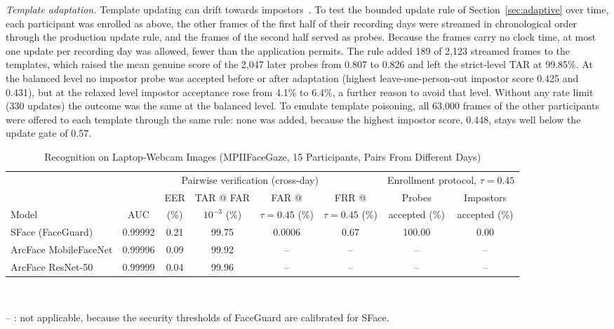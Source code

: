 \documentclass{ieeeaccess}
\begin{document}
\emph{Template adaptation.} Template updating can drift towards impostors~\cite{rattani2008coupdate}. To test the bounded update rule of Section~\ref{sec:adaptive} over time, each participant was enrolled as above, the other frames of the first half of their recording days were streamed in chronological order through the production update rule, and the frames of the second half served as probes. Because the frames carry no clock time, at most one update per recording day was allowed, fewer than the application permits. The rule added 189 of 2,123 streamed frames to the templates, which raised the mean genuine score of the 2,047 later probes from 0.807 to 0.826 and left the strict-level TAR at 99.85\%. At the balanced level no impostor probe was accepted before or after adaptation (highest leave-one-person-out impostor score 0.425 and 0.431), but at the relaxed level impostor acceptance rose from 4.1\% to 6.4\%, a further reason to avoid that level. Without any rate limit (330 updates) the outcome was the same at the balanced level. To emulate template poisoning, all 63,000 frames of the other participants were offered to each template through the same rule: none was added, because the highest impostor score, 0.448, stays well below the update gate of 0.57.

\begin{table}[!t]
\centering
\caption{Recognition on Laptop-Webcam Images (MPIIFaceGaze, 15 Participants, Pairs From Different Days)}
\label{tab:mpii}
\footnotesize
\setlength{\tabcolsep}{5pt}
\begin{tabular}{@{}lccccccc@{}}
\toprule
 & \multicolumn{5}{c}{Pairwise verification (cross-day)} & \multicolumn{2}{c}{Enrollment protocol, $\tau=0.45$} \\
\cmidrule(lr){2-6}\cmidrule(l){7-8}
 & & EER & TAR @ FAR & FAR @ & FRR @ & Probes & Impostors \\
Model & AUC & (\%) & $10^{-3}$ (\%) & $\tau{=}0.45$ (\%) & $\tau{=}0.45$ (\%) & accepted (\%) & accepted (\%) \\
\midrule
SFace (FaceGuard) & 0.99992 & 0.21 & 99.75 & 0.0006 & 0.67 & 100.00 & 0.00 \\
ArcFace MobileFaceNet & 0.99996 & 0.09 & 99.92 & -- & -- & -- & -- \\
ArcFace ResNet-50 & 0.99999 & 0.04 & 99.96 & -- & -- & -- & -- \\

\bottomrule
\end{tabular}\\[2pt]
\raggedright\scriptsize -- : not applicable, because the security thresholds of FaceGuard are calibrated for SFace.
\end{table}
\end{document}
